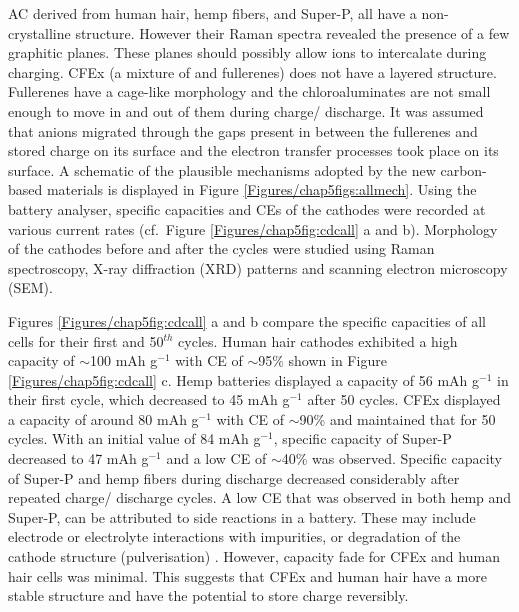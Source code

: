 AC derived from human hair, hemp fibers, and Super-P, all have a non- crystalline structure. However their Raman spectra revealed the presence of a few graphitic planes. These planes should possibly allow  ions to intercalate during charging. CFEx (a mixture of  and  fullerenes) does not have a layered structure. Fullerenes have a cage-like morphology and the chloroaluminates are not small enough to move in and out of them during charge/ discharge. It was assumed that  anions migrated through the gaps present in between the fullerenes and stored charge on its surface and the electron transfer processes took place on its surface. A schematic of the plausible mechanisms adopted by the new carbon-based materials is displayed in Figure \ref{Figures/chap5figs:allmech}. Using the battery analyser, specific capacities and CEs of the cathodes were recorded at various current rates (cf.\ Figure \ref{Figures/chap5fig:cdcall} a and b). Morphology of the cathodes before and after the cycles were studied using Raman spectroscopy, X-ray diffraction (XRD) patterns and scanning electron microscopy (SEM).

Figures \ref{Figures/chap5fig:cdcall} a and b compare the specific capacities of all cells for their first and 50$^{th}$ cycles. Human hair cathodes exhibited a high capacity of $\sim$100 mAh g$^{-1}$ with CE of $\sim$95$\%$ shown in Figure \ref{Figures/chap5fig:cdcall} c. Hemp batteries displayed a capacity of 56 mAh g$^{-1}$ in their first cycle, which decreased to 45 mAh g$^{-1}$ after 50 cycles. CFEx displayed a capacity of around 80 mAh g$^{-1}$ with CE of $\sim$90\% and maintained that for 50 cycles. With an initial value of 84 mAh g$^{-1}$, specific capacity of Super-P decreased to 47 mAh g$^{-1}$ and a low CE of $\sim$40\% was observed. Specific capacity of Super-P and hemp fibers during discharge decreased considerably after repeated charge/ discharge cycles. A low CE that was observed in both hemp and Super-P, can be attributed to side reactions in a battery. These may include electrode or electrolyte interactions with impurities, or degradation of the cathode structure (pulverisation) \cite{gyenes_understanding_2015}. However, capacity fade for CFEx and human hair cells was minimal. This suggests that CFEx and human hair have a more stable structure and have the potential to store charge reversibly.\\


